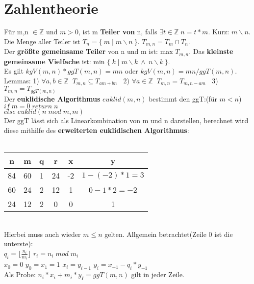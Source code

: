 \documentclass[11pt]{article}
\begin{document}
\section{Zahlentheorie}
F{\"u}r m,n $\in \mathbb{Z}$ und $m > 0$, ist m {\bfseries Teiler von} n, falls $\exists t\in \mathbb{Z} \; n=t*m$. Kurz: $m\backslash n$.\\
Die Menge aller Teiler ist $T_n = \{\: m \; |\;  m\backslash n \: \}$. $T_{m,n} = T_m \cap T_n$.\\
Der {\bfseries gr{\"o}{\ss}te gemeinsame Teiler} von n und m ist: max $T_{m,n}$. Das {\bfseries kleinste gemeinsame Vielfache} ist: min $\{\: k \; |\; m\backslash k \: \land \: n \backslash k \: \}$.\\
Es gilt $kgV(m,n) * ggT(m,n) = mn$ oder $kgV(m,n) = mn / ggT(m,n)$.\\
Lemmas: 1) $\forall a,b \in \mathbb{Z} \; \; T_{m,n} \subseteq T_{am+bn}\;\;$ 2) $\forall a \in \mathbb{Z} \; \; T_{m,n} = T_{m,n-am}\; \;$ 3) $T_{m,n} = T_{ggT(m,n)}$\\
Der {\bfseries euklidische Algorithmus} $euklid(m,n)$ bestimmt den ggT:(f{\"u}r $m<n$)\\
$if\; m = 0\; return\; n$\\ $else\; euklid(n\; mod\; m, m)$\\
Der ggT l{\"a}sst sich als Linearkombination von m und n darstellen, berechnet wird diese mithilfe des {\bfseries erweiterten euklidischen Algorithmus}:\\ \\
 \begin{tabular}{|c|c|c|c| |c|c|}\hline
  n  & m  & q & r  & x  & y \\ \hline
  84 & 60 & 1 & 24 & -2 & $1 - (-2)*1 = 3$ \\ \hline
  60 & 24 & 2 & 12 & 1  & $0-1*2=-2$ \\ \hline
  24 & 12 & 2 & 0  & 0  & 1 \\ \hline
 \end{tabular}\\
Hierbei muss auch wieder $m \leq n$ gelten.
Allgemein betrachtet(Zeile 0 ist die unterste):\\ $q_i = \lfloor \frac{n_i}{m_i} \rfloor$ \hspace{5mm} $r_i = n_i\; mod\; m_i$\\
$x_0 = 0$ $y_0 = x_1 = 1$ \hspace{5mm} $x_i = y_{i-1}$ \hspace{5mm} $y_i=x_{-1}-q_i*y_{-1}$ \\ Als Probe: $n_i*x_i+m_i*y_I = ggT(m,n)$ gilt in jeder Zeile.
\end{document}
